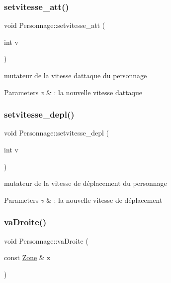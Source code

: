 \subsubsection{\texorpdfstring{setvitesse\+\_\+att()}{setvitesse\_att()}}
{\footnotesize\ttfamily void Personnage\+::setvitesse\+\_\+att (\begin{DoxyParamCaption}\item[{int}]{v }\end{DoxyParamCaption})}



mutateur de la vitesse d\textquotesingle{}attaque du personnage 


\begin{DoxyParams}{Parameters}
{\em v} & \+: la nouvelle vitesse d\textquotesingle{}attaque \\
\hline
\end{DoxyParams}
\mbox{\label{class_personnage_a83413930bb8bf7989828038c659e315f}} 
\subsubsection{\texorpdfstring{setvitesse\+\_\+depl()}{setvitesse\_depl()}}
{\footnotesize\ttfamily void Personnage\+::setvitesse\+\_\+depl (\begin{DoxyParamCaption}\item[{int}]{v }\end{DoxyParamCaption})}



mutateur de la vitesse de déplacement du personnage 


\begin{DoxyParams}{Parameters}
{\em v} & \+: la nouvelle vitesse de déplacement \\
\hline
\end{DoxyParams}
\mbox{\label{class_personnage_a3f17f84143f3a6f8fcafa1a9ecd5ced6}} 
\subsubsection{\texorpdfstring{va\+Droite()}{vaDroite()}}
{\footnotesize\ttfamily void Personnage\+::va\+Droite (\begin{DoxyParamCaption}\item[{const \hyperlink{class_zone}{Zone} \&}]{z }\end{DoxyParamCaption})}



